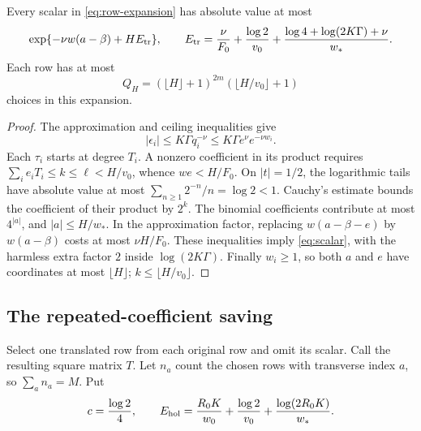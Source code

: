 \begin{lemma}\label{lem:scalar}
Every scalar in \eqref{eq:row-expansion} has absolute value at most
\begin{equation}\label{eq:scalar}
 \exp\{-\nu w(a-\beta)+H E_{\rm tr}\},
 \qquad
 E_{\rm tr}=\frac{\nu}{F_0}+\frac{\log2}{v_0}
       +\frac{\log4+\log(2K\Gamma)+\nu}{w_*}.
\end{equation}
Each row has at most
\[
 Q_H=(\lfloor H\rfloor+1)^{2m}(\lfloor H/v_0\rfloor+1)
\]
choices in this expansion.
\end{lemma}
\begin{proof}
The approximation and ceiling inequalities give
\[
 |\epsilon_i|\le K\Gamma q_i^{-\nu}
              \le K\Gamma e^\nu e^{-\nu w_i}.
\]
Each \(\tau_i\) starts at degree \(T_i\).
A nonzero coefficient in its product requires
\(\sum_i e_iT_i\le k\le\ell<H/v_0\), whence
\(we<H/F_0\).
On \(|t|=1/2\), the logarithmic tails have absolute value at most
\(\sum_{n\ge1}2^{-n}/n=\log2<1\).
Cauchy's estimate bounds the coefficient of their product by \(2^k\).
The binomial coefficients contribute at most \(4^{|a|}\), and
\(|a|\le H/w_*\).
In the approximation factor, replacing \(w(a-\beta-e)\) by
\(w(a-\beta)\) costs at most \(\nu H/F_0\).
These inequalities imply \eqref{eq:scalar}, with the harmless extra
factor \(2\) inside \(\log(2K\Gamma)\).
Finally \(w_i\ge1\), so both \(a\) and \(e\) have coordinates at
most \(\lfloor H\rfloor\); \(k\le\lfloor H/v_0\rfloor\).
\end{proof}

\subsection{The repeated-coefficient saving}

Select one translated row from each original row and omit its scalar.
Call the resulting square matrix \(T\). Let \(n_a\) count the chosen
rows with transverse index \(a\), so \(\sum_a n_a=M\).
Put
\[
 c=\frac{\log2}{4},\qquad
 E_{\rm hol}=\frac{R_0K}{w_0}+\frac{\log2}{v_0}
                   +\frac{\log(2R_0K)}{w_*}.
\]

